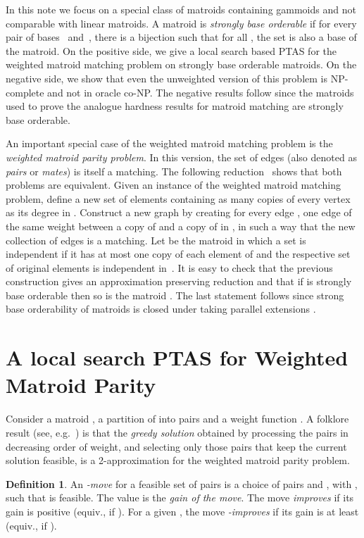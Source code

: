 \documentclass[letterpaper,11pt]{article}
\theoremstyle{definition}
\newtheorem{definition}[theorem]{Definition}
\begin{document}
In this note we focus on a special class of matroids containing gammoids and not comparable with linear matroids. A matroid  is \emph{strongly base orderable} if for every pair of bases ~and~, there is a bijection  such that for all , the set  is also a base of the matroid. On the positive side, we give a local search based PTAS for the weighted matroid matching problem on strongly base orderable matroids. On the negative side, we show that even the unweighted version of this problem is NP-complete and not in oracle co-NP. The negative results follow since the matroids used to prove the analogue hardness results for matroid matching are strongly base orderable.

An important special case of the weighted matroid matching problem is the \emph{weighted matroid parity problem}. In this version, the set  of edges (also denoted as \emph{pairs} or \emph{mates}) is itself a matching. The following reduction~\cite{LeeSV10} shows that both problems are equivalent. Given an instance  of the weighted matroid matching problem, define a new set  of elements containing as many copies of every vertex  as its degree in . Construct a new graph  by creating for every edge , one edge of the same weight between a copy of  and a copy of  in , in such a way that the new collection of edges  is a matching. Let  be the matroid in which a set  is independent if it has at most one copy of each element of  and the respective set  of original elements is independent in~. It is easy to check that the previous construction gives an approximation preserving reduction and that if  is strongly base orderable then so is the matroid . The last statement follows since strong base orderability of matroids is closed under taking parallel extensions \cite[Section 42.6c]{Schrijver-book}.

\section{A local search PTAS for Weighted Matroid Parity}
Consider a matroid , a partition  of  into  pairs and a weight function . A folklore result (see, e.g.~\cite{LeeSV10}) is that the \emph{greedy solution} obtained by processing the pairs in decreasing order of weight, and selecting only those pairs that keep the current solution feasible, is a 2-approximation for the weighted matroid parity problem.

\begin{definition} An \emph{-move} for a feasible set of pairs  is a choice of pairs  and , with , such that   is feasible. The value  is the \emph{gain of the move}. The move \emph{improves } if its gain is positive (equiv., if ). For a given , the move \emph{-improves } if its gain is at least  (equiv., if ).
\end{definition}
\end{document}
